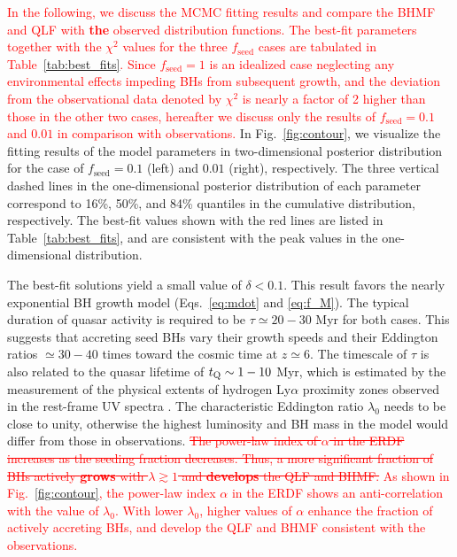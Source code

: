 \documentclass[twocolumn, twocolappendix]{aastex63}
\newcommand{\tlife}{\tau}
\newcommand{\fseed}{f_\mathrm{seed}}
\newcommand{\red}[1]{\textcolor{red}{ #1}}
\begin{document}
\begin{CJK*}{UTF8}{gbsn}
\red{
In the following, we discuss the MCMC fitting results and compare the BHMF and QLF with \textbf{the} observed distribution functions.
The best-fit parameters together with the $\chi^2$ values for the three $\fseed$ cases are tabulated in Table~\ref{tab:best_fits}.
Since $\fseed=1$ is an idealized case neglecting any environmental effects impeding BHs from subsequent growth,
and the deviation from the observational data denoted by $\chi^2$ is nearly a factor of 2 higher than those in the other two cases,
hereafter we discuss only the results of $\fseed=0.1$ and $0.01$ in comparison with observations.
}
In Fig.~\ref{fig:contour}, we visualize the fitting results of the model parameters in two-dimensional 
posterior distribution for the case of $\fseed= 0.1$ (left) and $0.01$ (right), respectively.
The three vertical dashed lines in the one-dimensional posterior distribution of each parameter
correspond to 16\%, 50\%, and 84\% quantiles in the cumulative distribution, respectively.
The best-fit values shown with the red lines are listed in Table~\ref{tab:best_fits},
and are consistent with the peak values in the one-dimensional distribution.


The best-fit solutions yield a small value of $\delta < 0.1$.
This result favors the nearly exponential BH growth model (Eqs.~\ref{eq:mdot} and \ref{eq:f_M}).
The typical duration of quasar activity is required to be $\tlife \simeq 20-30$ Myr for both cases.
This suggests that accreting seed BHs vary their growth speeds and their Eddington ratios 
$\simeq 30-40$ times toward the cosmic time at $z\simeq 6$.
The timescale of $\tlife$ is also related to the quasar lifetime of $t_{\rm Q}\sim 1-10$ Myr, 
which is estimated by the measurement of the physical extents of hydrogen Ly$\alpha$ proximity zones 
observed in the rest-frame UV spectra \citep[e.g.,][]{2018ApJ...867...30E,2019ApJ...884L..19D}.
The characteristic Eddington ratio $\lambda_0$ needs to be close to unity, otherwise the highest luminosity and BH mass
in the model would differ from those in observations.
\red{
\sout{The power-law index of $\alpha$ in the ERDF increases as the seeding fraction decreases.
Thus, a more significant fraction of BHs actively \textbf{grows} with $\lambda \gtrsim 1$ and \textbf{develops} the QLF and BHMF.
}
As shown in Fig.~\ref{fig:contour}, the power-law index $\alpha$ in the ERDF shows an anti-correlation with the value of $\lambda_0$.
With lower $\lambda_0$, higher values of $\alpha$ enhance the fraction of actively accreting BHs,
and develop the QLF and BHMF consistent with the observations.
}


\end{CJK*}
\end{document}
